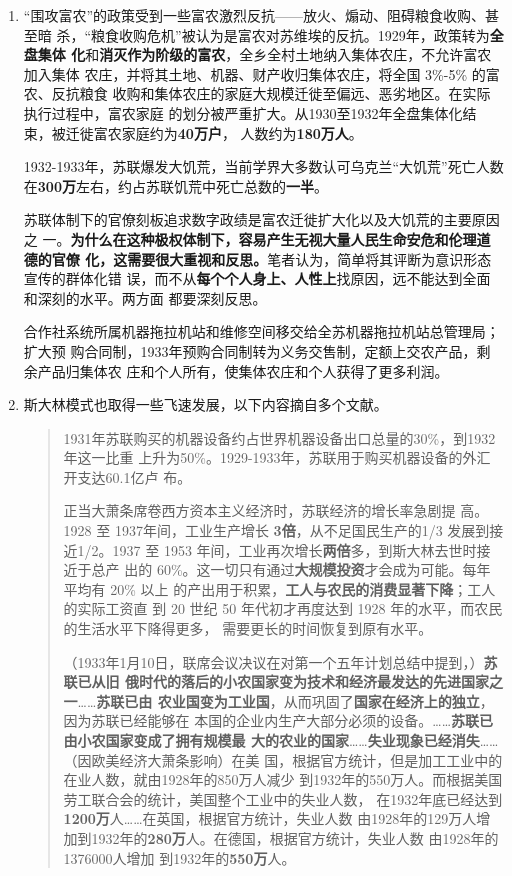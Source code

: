 \begin{enumerate}

\item “围攻富农”的政策受到一些富农激烈反抗——放火、煽动、阻碍粮食收购、甚至暗
  杀，“粮食收购危机”被认为是富农对苏维埃的反抗。1929年，政策转为\textbf{全盘集体
    化}和\textbf{消灭作为阶级的富农}，全乡全村土地纳入集体农庄，不允许富农加入集体
  农庄，并将其土地、机器、财产收归集体农庄，将全国 3\%-5\% 的富农、反抗粮食
  收购和集体农庄的家庭大规模迁徙至偏远、恶劣地区。在实际执行过程中，富农家庭
  的划分被严重扩大。从1930至1932年全盘集体化结束，被迁徙富农家庭约为\textbf{40万户}，
  人数约为\textbf{180万人}。\cite{xulongbinsu}

  1932-1933年，苏联爆发大饥荒，当前学界大多数认可乌克兰“大饥荒”死亡人数
  在\textbf{300万}左右，约占苏联饥荒中死亡总数的\textbf{一半}。\cite{wukelanjihuang}

  苏联体制下的官僚刻板追求数字政绩是富农迁徙扩大化以及大饥荒的主要原因之
  一。\textbf{为什么在这种极权体制下，容易产生无视大量人民生命安危和伦理道德的官僚
    化，这需要很大重视和反思。}笔者认为，简单将其评断为意识形态宣传的群体化错
  误，而不从\textbf{每个个人身上、人性上}找原因，远不能达到全面和深刻的水平。两方面
  都要深刻反思。

  合作社系统所属机器拖拉机站和维修空间移交给全苏机器拖拉机站总管理局；扩大预
  购合同制，1933年预购合同制转为义务交售制，定额上交农产品，剩余产品归集体农
  庄和个人所有，使集体农庄和个人获得了更多利润。

\item 斯大林模式也取得一些飞速发展，以下内容摘自多个文献。

  \begin{quotation}
    1931年苏联购买的机器设备约占世界机器设备出口总量的30\%，到1932年这一比重
    上升为50\%。1929-1933年，苏联用于购买机器设备的外汇开支达60.1亿卢
    布。

    正当大萧条席卷西方资本主义经济时，苏联经济的增长率急剧提
    高。 1928 至 1937年间，工业生产增长 \textbf{3倍}，从不足国民生产的1/3 发展到接
    近1/2。1937 至 1953 年间，工业再次增长\textbf{两倍}多，到斯大林去世时接近于总产
    出的 60\%。这一切只有通过\textbf{大规模投资}才会成为可能。每年平均有 20\% 以上
    的产出用于积累，\textbf{工人与农民的消费显著下降}；工人的实际工资直
    到 20 世纪 50 年代初才再度达到 1928 年的水平，而农民的生活水平下降得更多，
    需要更长的时间恢复到原有水平。

    （1933年1月10日，联席会议决议在对第一个五年计划总结中提到，）\textbf{苏联已从旧
      俄时代的落后的小农国家变为技术和经济最发达的先进国家之一}……\textbf{苏联已由
      农业国变为工业国}，从而巩固了\textbf{国家在经济上的独立}，因为苏联已经能够在
    本国的企业内生产大部分必须的设备。……\textbf{苏联已由小农国家变成了拥有规模最
      大的农业的国家}……\textbf{失业现象已经消失}……（因欧美经济大萧条影响）在美
    国，根据官方统计，但是加工工业中的在业人数，就由1928年的850万人减少
    到1932年的550万人。而根据美国劳工联合会的统计，美国整个工业中的失业人数，
    在1932年底已经达到\textbf{1200万}人……在英国，根据官方统计，失业人数
    由1928年的129万人增加到1932年的\textbf{280万}人。在德国，根据官方统计，失业人数
    由1928年的1376000人增加
    到1932年的\textbf{550万}人。


\end{quotation}
\end{enumerate}
